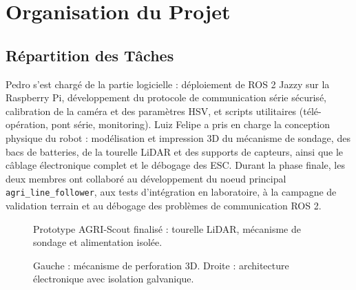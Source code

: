 \section{Organisation du Projet}

\subsection{Répartition des Tâches}

Pedro s'est chargé de la partie logicielle : déploiement de ROS 2 Jazzy sur la Raspberry Pi, développement du protocole de communication série sécurisé, calibration de la caméra et des paramètres HSV, et scripts utilitaires (télé-opération, pont série, monitoring). Luiz Felipe a pris en charge la conception physique du robot : modélisation et impression 3D du mécanisme de sondage, des bacs de batteries, de la tourelle LiDAR et des supports de capteurs, ainsi que le câblage électronique complet et le débogage des ESC. Durant la phase finale, les deux membres ont collaboré au développement du noeud principal \texttt{agri\_line\_follower}, aux tests d'intégration en laboratoire, à la campagne de validation terrain et au débogage des problèmes de communication ROS 2.

\begin{figure}[H]
    \centering
    \caption{Prototype AGRI-Scout finalisé : tourelle LiDAR, mécanisme de sondage et alimentation isolée.}
    \label{fig:robot_final}
\end{figure}

\begin{figure}[H]
    \centering
    \begin{minipage}{0.48\textwidth}
        \centering
    \end{minipage}
    \hfill
    \begin{minipage}{0.48\textwidth}
        \centering
    \end{minipage}
    \caption{Gauche : mécanisme de perforation 3D. Droite : architecture électronique avec isolation galvanique.}
    \label{fig:details_robot}
\end{figure}


